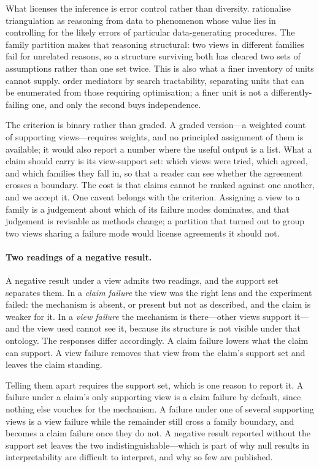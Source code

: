 \documentclass{article}
\begin{document}
What licenses the inference is error control rather than diversity.
\citet{kuorikoski2016} rationalise triangulation as reasoning from data to
phenomenon whose value lies in controlling for the likely errors of
particular data-generating procedures.  The family partition makes that
reasoning structural: two views in different families fail for unrelated
reasons, so a structure surviving both has cleared two sets of assumptions
rather than one set twice.  This is also what a finer inventory of units
cannot supply.  \citet{mueller2025mediator} order mediators by search
tractability, separating units that can be enumerated from those requiring
optimisation; a finer unit is not a differently-failing one, and only the
second buys independence.

The criterion is binary rather than graded.
A graded version---a weighted count of supporting views---requires weights,
and no principled assignment of them is available; it would also report a
number where the useful output is a list.  What a claim should carry is its
view-support set: which views were tried, which agreed, and which families
they fall in, so that a reader can see whether the agreement crosses a
boundary.  The cost is that claims cannot be ranked against one another,
and we accept it.  One caveat belongs with the criterion.  Assigning a view
to a family is a judgement about which of its failure modes dominates, and
that judgement is revisable as methods change; a partition that turned out
to group two views sharing a failure mode would license agreements it
should not.

\paragraph{Two readings of a negative result.}
A negative result under a view admits two readings, and the support set
separates them.  In a \emph{claim failure} the view was the right lens and
the experiment failed: the mechanism is absent, or present but not as
described, and the claim is weaker for it.  In a \emph{view failure} the
mechanism is there---other views support it---and the view used cannot see
it, because its structure is not visible under that ontology.  The
responses differ accordingly.  A claim failure lowers what the claim can
support.  A view failure removes that view from the claim's support set
and leaves the claim standing.

Telling them apart requires the support set, which is one reason to report
it.  A failure under a claim's only supporting view is a claim failure by
default, since nothing else vouches for the mechanism.  A failure under
one of several supporting views is a view failure while the remainder
still cross a family boundary, and becomes a claim failure once they do
not.  A negative result reported without the support set leaves the two
indistinguishable---which is part of why null results in interpretability
are difficult to interpret, and why so few are published.
\end{document}
